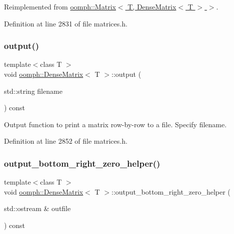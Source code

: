 Reimplemented from \hyperlink{classoomph_1_1Matrix_ace9b59cbe514c77f0b3816b144c740f6}{oomph\+::\+Matrix$<$ T, Dense\+Matrix$<$ T $>$ $>$}.



Definition at line 2831 of file matrices.\+h.

\mbox{\label{classoomph_1_1DenseMatrix_a4ab60b1e7db98bcb5b75b080266e452e}} 
\subsubsection{\texorpdfstring{output()}{output()}\hspace{0.1cm}{\footnotesize\ttfamily [2/2]}}
{\footnotesize\ttfamily template$<$class T $>$ \\
void \hyperlink{classoomph_1_1DenseMatrix}{oomph\+::\+Dense\+Matrix}$<$ T $>$\+::output (\begin{DoxyParamCaption}\item[{std\+::string}]{filename }\end{DoxyParamCaption}) const}



Output function to print a matrix row-\/by-\/row to a file. Specify filename. 



Definition at line 2852 of file matrices.\+h.

\mbox{\label{classoomph_1_1DenseMatrix_aa02dc7c9b2f4e1cc1204cc8281f030f9}} 
\subsubsection{\texorpdfstring{output\+\_\+bottom\+\_\+right\+\_\+zero\+\_\+helper()}{output\_bottom\_right\_zero\_helper()}}
{\footnotesize\ttfamily template$<$class T $>$ \\
void \hyperlink{classoomph_1_1DenseMatrix}{oomph\+::\+Dense\+Matrix}$<$ T $>$\+::output\+\_\+bottom\+\_\+right\+\_\+zero\+\_\+helper (\begin{DoxyParamCaption}\item[{std\+::ostream \&}]{outfile }\end{DoxyParamCaption}) const\hspace{0.3cm}{\ttfamily [virtual]}}



